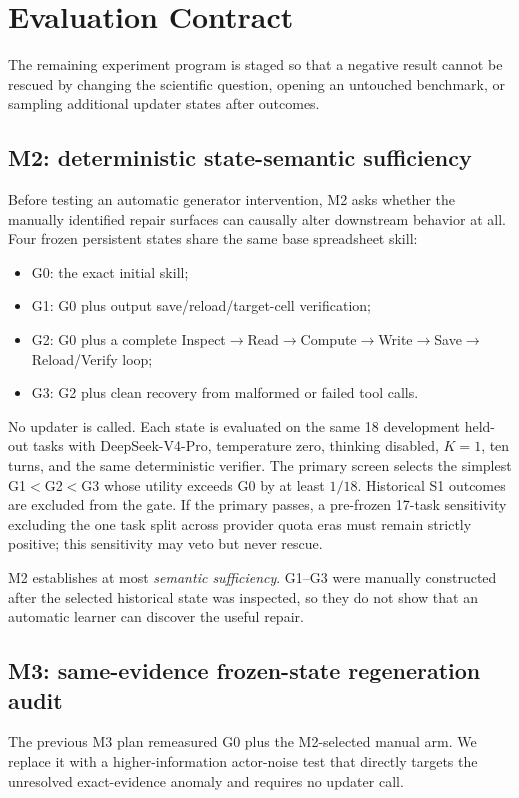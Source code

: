 \section{Evaluation Contract}
\label{sec:evaluation}

The remaining experiment program is staged so that a negative result cannot be rescued by changing the scientific question, opening an untouched benchmark, or sampling additional updater states after outcomes.

\subsection{M2: deterministic state-semantic sufficiency}
Before testing an automatic generator intervention, M2 asks whether the manually identified repair surfaces can causally alter downstream behavior at all. Four frozen persistent states share the same base spreadsheet skill:
\begin{itemize}
    \item G0: the exact initial skill;
    \item G1: G0 plus output save/reload/target-cell verification;
    \item G2: G0 plus a complete Inspect$\rightarrow$Read$\rightarrow$Compute$\rightarrow$Write$\rightarrow$Save$\rightarrow$Reload/Verify loop;
    \item G3: G2 plus clean recovery from malformed or failed tool calls.
\end{itemize}
No updater is called. Each state is evaluated on the same 18 development held-out tasks with DeepSeek-V4-Pro, temperature zero, thinking disabled, $K=1$, ten turns, and the same deterministic verifier. The primary screen selects the simplest G1$<$G2$<$G3 whose utility exceeds G0 by at least $1/18$. Historical S1 outcomes are excluded from the gate. If the primary passes, a pre-frozen 17-task sensitivity excluding the one task split across provider quota eras must remain strictly positive; this sensitivity may veto but never rescue.

M2 establishes at most \emph{semantic sufficiency}. G1--G3 were manually constructed after the selected historical state was inspected, so they do not show that an automatic learner can discover the useful repair.

\subsection{M3: same-evidence frozen-state regeneration audit}
The previous M3 plan remeasured G0 plus the M2-selected manual arm. We replace it with a higher-information actor-noise test that directly targets the unresolved exact-evidence anomaly and requires no updater call.

